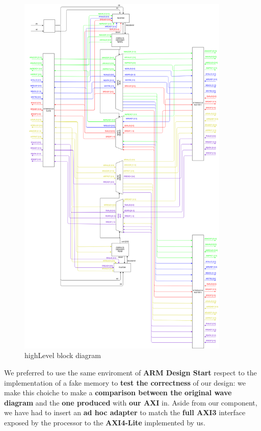 \begin{figure}[h]
  \includegraphics[width=0.9\textwidth, angle=0]{"./../../img/Images/highLevel.png"}
  \caption{highLevel block diagram}
  \label{HLBD}
\end{figure}

{}
 We preferred to use the same enviroment of {\bf ARM Design Start} respect to the implementation of a fake memory to {\bf test the correctness} of our design: we make this choiche to make a {\bf comparison between the original wave diagram} and the {\bf one produced} with {\bf our AXI} in. Aside from our component, we have had to insert an {\bf ad hoc adapter} to match the {\bf full AXI3} interface exposed by the processor to the {\bf AXI4-Lite} implemented by us.
\newline
